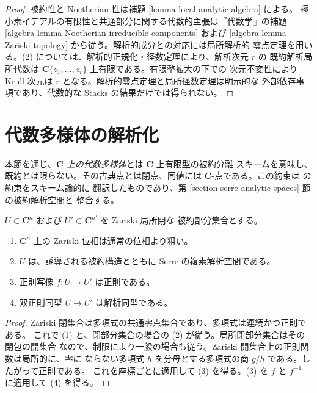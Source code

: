 \begin{proof}
被約性と Noetherian 性は補題 \ref{lemma-local-analytic-algebra} による。
極小素イデアルの有限性と共通部分に関する代数的主張は『代数学』の補題
\ref{algebra-lemma-Noetherian-irreducible-components} および
\ref{algebra-lemma-Zariski-topology} から従う。解析的成分との対応には局所解析的
零点定理を用いる。(2) については、解析的正規化・径数定理により、解析次元 $r$ の
既約解析局所代数は $\mathbf C\{z_1,\ldots,z_r\}$ 上有限である。有限整拡大の下での
次元不変性により Krull 次元は $r$ となる。解析的零点定理と局所径数定理は明示的な
外部依存事項であり、代数的な Stacks の結果だけでは得られない。
\end{proof}




%

\section{代数多様体の解析化}
\label{section-analytification}

\noindent
本節を通じ、{\it $\mathbf C$ 上の代数多様体}とは $\mathbf C$ 上有限型の被約分離
スキームを意味し、既約とは限らない。その古典点とは閉点、同値には
$\mathbf C$-点である。この約束は \cite[\S 2、第5項]{GAGA} の約束をスキーム論的に
翻訳したものであり、第 \ref{section-serre-analytic-spaces} 節の被約解析空間と
整合する。

\begin{lemma}
\label{lemma-algebraic-charts-analytic}
$U \subset \mathbf C^n$ および $U' \subset \mathbf C^{n'}$ を Zariski 局所閉な
被約部分集合とする。
\begin{enumerate}
\item $\mathbf C^n$ 上の Zariski 位相は通常の位相より粗い。
\item $U$ は、誘導される被約構造とともに Serre の複素解析空間である。
\item 正則写像 $f : U \to U'$ は正則である。
\item 双正則同型 $U \to U'$ は解析同型である。
\end{enumerate}
\end{lemma}

\begin{proof}
Zariski 閉集合は多項式の共通零点集合であり、多項式は連続かつ正則である。
これで (1) と、閉部分集合の場合の (2) が従う。局所閉部分集合はその閉包の開集合
なので、制限により一般の場合も従う。Zariski 開集合上の正則関数は局所的に、零に
ならない多項式 $h$ を分母とする多項式の商 $g/h$ である。したがって正則である。
これを座標ごとに適用して (3) を得る。(3) を $f$ と $f^{-1}$ に適用して (4) を得る。
\end{proof}

